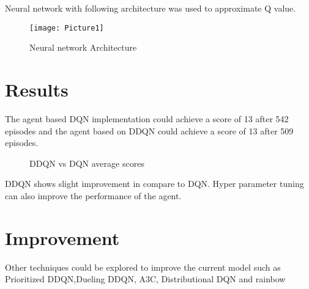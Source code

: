\documentclass[]{article}
\begin{document}
Neural network with following architecture was used to approximate Q value. 
\begin{figure}
	\centering
	\texttt{[image: Picture1]}
	\caption{Neural network Architecture}
	\label{fig:picture1}
\end{figure}

\section{Results}
The agent based DQN implementation could achieve a score of 13 after 542 episodes and the agent based on DDQN could achieve a score of 13 after 509 episodes.

\begin{figure}
	\centering
	\hfill
	\hfill
	\caption{DDQN vs DQN  average scores  }
\end{figure}

DDQN shows slight improvement in compare to DQN.  Hyper parameter tuning can also improve the performance of the agent. 

\section{Improvement}
Other techniques could be explored to improve the current model such as Prioritized DDQN,Dueling DDQN, A3C, Distributional DQN and rainbow \cite{hessel2017rainbow}


\clearpage



\end{document}
